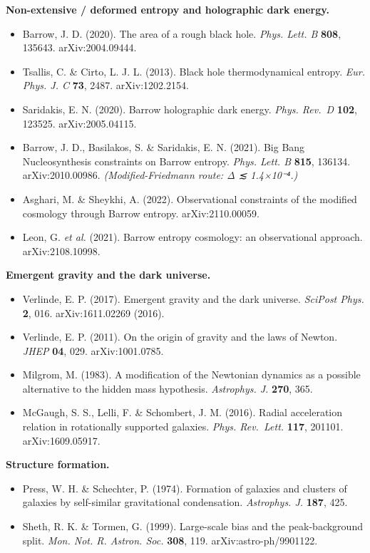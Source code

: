 \documentclass[
  10pt,
]{article}
\providecommand{\tightlist}{%
  \setlength{\itemsep}{0pt}\setlength{\parskip}{0pt}}
\begin{document}
\textbf{Non-extensive / deformed entropy and holographic dark energy.}

\begin{itemize}
\tightlist
\item
  Barrow, J. D. (2020). The area of a rough black hole. \emph{Phys.
  Lett. B} \textbf{808}, 135643. arXiv:2004.09444.
\item
  Tsallis, C. \& Cirto, L. J. L. (2013). Black hole thermodynamical
  entropy. \emph{Eur. Phys. J. C} \textbf{73}, 2487. arXiv:1202.2154.
\item
  Saridakis, E. N. (2020). Barrow holographic dark energy. \emph{Phys.
  Rev.~D} \textbf{102}, 123525. arXiv:2005.04115.
\item
  Barrow, J. D., Basilakos, S. \& Saridakis, E. N. (2021). Big Bang
  Nucleosynthesis constraints on Barrow entropy. \emph{Phys. Lett. B}
  \textbf{815}, 136134. arXiv:2010.00986. \emph{(Modified-Friedmann
  route: Δ ≲ 1.4×10⁻⁴.)}
\item
  Asghari, M. \& Sheykhi, A. (2022). Observational constraints of the
  modified cosmology through Barrow entropy. arXiv:2110.00059.
\item
  Leon, G. \emph{et al.} (2021). Barrow entropy cosmology: an
  observational approach. arXiv:2108.10998.
\end{itemize}

\textbf{Emergent gravity and the dark universe.}

\begin{itemize}
\tightlist
\item
  Verlinde, E. P. (2017). Emergent gravity and the dark universe.
  \emph{SciPost Phys.} \textbf{2}, 016. arXiv:1611.02269 (2016).
\item
  Verlinde, E. P. (2011). On the origin of gravity and the laws of
  Newton. \emph{JHEP} \textbf{04}, 029. arXiv:1001.0785.
\item
  Milgrom, M. (1983). A modification of the Newtonian dynamics as a
  possible alternative to the hidden mass hypothesis. \emph{Astrophys.
  J.} \textbf{270}, 365.
\item
  McGaugh, S. S., Lelli, F. \& Schombert, J. M. (2016). Radial
  acceleration relation in rotationally supported galaxies. \emph{Phys.
  Rev.~Lett.} \textbf{117}, 201101. arXiv:1609.05917.
\end{itemize}

\textbf{Structure formation.}

\begin{itemize}
\tightlist
\item
  Press, W. H. \& Schechter, P. (1974). Formation of galaxies and
  clusters of galaxies by self-similar gravitational condensation.
  \emph{Astrophys. J.} \textbf{187}, 425.
\item
  Sheth, R. K. \& Tormen, G. (1999). Large-scale bias and the
  peak-background split. \emph{Mon. Not. R. Astron. Soc.} \textbf{308},
  119. arXiv:astro-ph/9901122.
\end{itemize}
\end{document}
